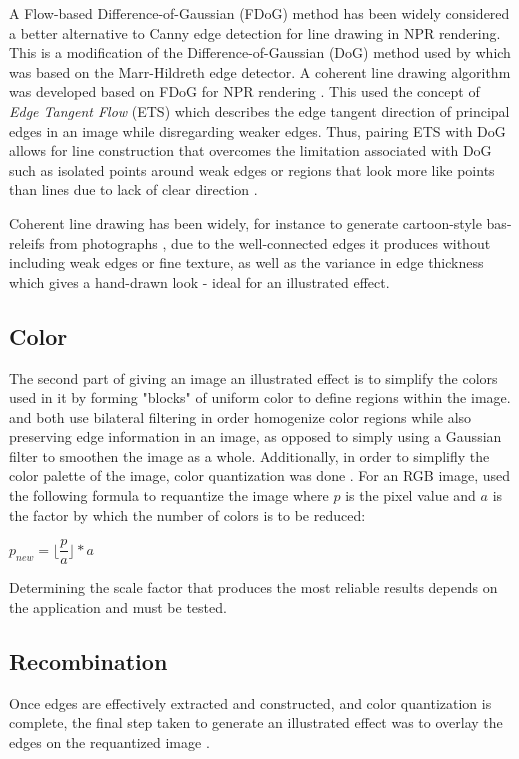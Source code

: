 \documentclass{article}
\begin{document}
A Flow-based Difference-of-Gaussian (FDoG) method has been widely considered a better alternative to Canny edge detection for line drawing in NPR rendering. This is a modification of the Difference-of-Gaussian (DoG) method used by \cite{gooch_human_2004} which was based on the Marr-Hildreth edge detector. A coherent line drawing algorithm was developed based on FDoG for NPR rendering \cite{kang_coherent_2007}. This used the concept of \textit{Edge Tangent Flow} (ETS) which describes the edge tangent direction of principal edges in an image while disregarding weaker edges. Thus, pairing ETS with DoG allows for line construction that overcomes the limitation associated with DoG such as isolated points around weak edges or regions that look more like points than lines due to lack of clear direction \cite{kang_coherent_2007}.

Coherent line drawing has been widely, for instance to generate cartoon-style bas-releifs from photographs \cite{lee_generation_2019}, due to the well-connected edges it produces without including weak edges or fine texture, as well as the variance in edge thickness which gives a hand-drawn look - ideal for an illustrated effect. 


\subsection{Color}
\label{ssec:color}
The second part of giving an image an illustrated effect is to simplify the colors used in it by forming "blocks" of uniform color to define regions within the image. \cite{dade_toonify_nodate} and \cite{lu_non-photorealistic_2013} both use bilateral filtering in order homogenize color regions while also preserving edge information in an image, as opposed to simply using a Gaussian filter to smoothen the image as a whole. Additionally, in order to simplifly the color palette of the image, color quantization was done \cite{lu_non-photorealistic_2013,dade_toonify_nodate}. For an RGB image, \cite{dade_toonify_nodate} used the following formula to requantize the image where $p$ is the pixel value and $a$ is the factor by which the number of colors is to be reduced:
\begin{center}
  $p_{new} = \lfloor \dfrac{p}{a} \rfloor * a$
\end{center}
Determining the scale factor that produces the most reliable results depends on the application and must be tested.  

\subsection{Recombination}
\label{ssec:rec}
Once edges are effectively extracted and constructed, and color quantization is complete, the final step taken to generate an illustrated effect was to overlay the edges on the requantized image \cite{lu_non-photorealistic_2013,dade_toonify_nodate}.  
\end{document}
